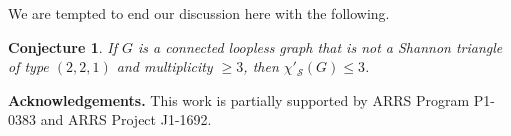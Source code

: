 \documentclass[a4paper,12pt]{article}
\newtheorem{conjecture}[theorem]{Conjecture}
\newtheorem{question}[theorem]{Question}
\newtheorem{problem}[theorem]{Problem}
\numberwithin{equation}{section}
\begin{document}
 We are tempted to end our discussion here with the following.

%

\begin{conjecture}
    \label{conj:3}
If $G$ is a connected loopless graph that is not a Shannon triangle of type $(2,2,1)$ and multiplicity $\geq3$, then $\chi'_{\mathcal{S}}(G)\leq3$.
\end{conjecture}



%



\bigskip
\noindent
{\bf Acknowledgements.}
This work is partially supported by ARRS Program P1-0383 and ARRS Project J1-1692.



\end{document}
